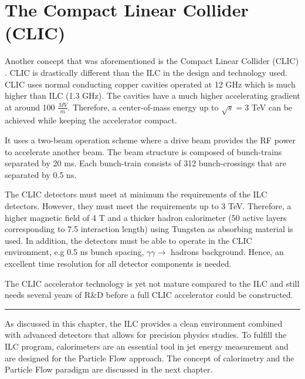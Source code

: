 \section{The Compact Linear Collider (CLIC)}

Another concept that was aforementioned is the Compact Linear Collider (CLIC) \cite{CLIC_CDR}. CLIC is drastically different than the ILC in the design and technology used. CLIC uses normal conducting copper cavities operated at 12 GHz which is much higher than ILC (1.3 GHz). The cavities have a much higher accelerating gradient at around 100 $\frac{MV}{m}$. Therefore, a center-of-mass energy up to $\sqrt{s} = 3$ TeV can be achieved while keeping the accelerator compact.

It uses a two-beam operation scheme where a drive beam provides the RF power to accelerate another beam. The beam structure is composed of bunch-trains separated by 20 ms. Each bunch-train consists of 312 bunch-crossings that are separated by 0.5 ns.

The CLIC detectors must meet at minimum the requirements of the ILC detectors. However, they must meet the requirements up to 3 TeV. Therefore, a higher magnetic field of 4 T and a thicker hadron calorimeter (50 active layers corresponding to 7.5 interaction length) using Tungsten as absorbing material is used. In addition, the detectors must be able to operate in the CLIC environment, e.g 0.5 ns bunch spacing, $\gamma\gamma \rightarrow$ hadrons background. Hence, an excellent time resolution for all detector components is needed.

The CLIC accelerator technology is yet not mature compared to the ILC and still needs several years of R\&D before a full CLIC accelerator could be constructed.

\begin{center}
  \rule{0.5\textwidth}{.4pt}
\end{center}

As discussed in this chapter, the ILC provides a clean environment combined with advanced detectors that allows for precision physics studies. To fulfill the ILC program, calorimeters are an essential tool in jet energy measurement and are designed for the Particle Flow approach. The concept of calorimetry and the Particle Flow paradigm are discussed in the next chapter.
